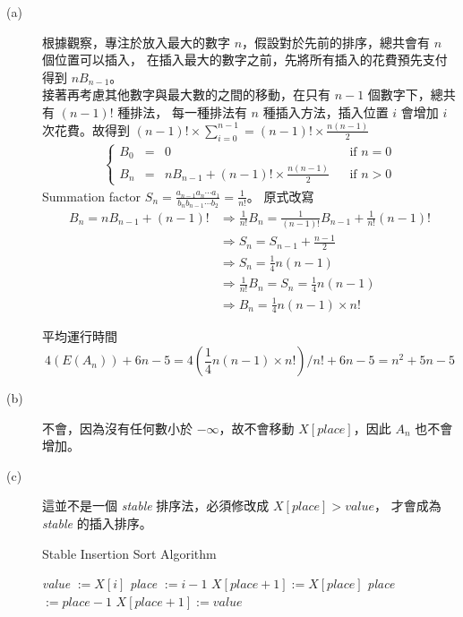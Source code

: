 \documentclass[11pt]{article}
\begin{document}
\begin{description}
	\item[(a)] 
		根據觀察，專注於放入最大的數字 $n$，假設對於先前的排序，總共會有 $n$ 個位置可以插入，
		在插入最大的數字之前，先將所有插入的花費預先支付得到 $n B_{n-1}$。 \\
		接著再考慮其他數字與最大數的之間的移動，在只有 $n-1$ 個數字下，總共有 $(n-1)!$ 種排法，
		每一種排法有 $n$ 種插入方法，插入位置 $i$ 會增加 $i$ 次花費。故得到 $(n-1)! \times \sum_{i=0}^{n-1} = (n-1)! \times \frac{n(n-1)}{2}$
		\begin{align*}
			\left\{\begin{matrix}
				B_0 &=& 0 && \text{if } n = 0\\
				B_n &=& n B_{n-1} + (n-1)! \times \frac{n(n-1)}{2} && \text{if } n > 0
			\end{matrix}\right.
		\end{align*}
		Summation factor $S_n = \frac{a_{n-1} a_n \cdots a_1}{b_n b_{n-1} \cdots b_2} = \frac{1}{n!}$。
		原式改寫
		\begin{align*}
			B_n = n B_{n-1} + (n-1)! 
			&\Rightarrow \frac{1}{n!}B_n = \frac{1}{(n-1)!} B_{n-1} + \frac{1}{n!}(n-1)! \\
			&\Rightarrow S_n = S_{n-1} + \frac{n-1}{2} \\
			&\Rightarrow S_n = \frac{1}{4} n(n-1) \\
			&\Rightarrow \frac{1}{n!}B_n = S_n = \frac{1}{4} n(n-1) \\
			&\Rightarrow B_n = \frac{1}{4} n(n-1) \times n!
		\end{align*}
		
		平均運行時間 $$4(E(A_n)) + 6n - 5 = 4(\frac{1}{4} n(n-1) \times n!)/n! + 6n - 5 = n^2 + 5n - 5$$
	\item[(b)]
		不會，因為沒有任何數小於 $-\infty$，故不會移動 $X[\textit{place}]$，因此 $A_n$ 也不會增加。
	\item[(c)]
		這並不是一個 \textit{stable} 排序法，必須修改成 $X[\textit{place}] > \textit{value}$，
		才會成為 \textit{stable} 的插入排序。
\begin{algorithm}
  \caption{Stable Insertion Sort Algorithm}\label{insert}
  \begin{algorithmic}[2]
  				
		\State \textit{value} $:= X[i]$		
		\State \textit{place} $:= i-1$		
				
			\State $X[\textit{place}+1] := X[\textit{place}]$	
			\State \textit{place} $:= \textit{place} - 1$	
		\EndWhile
		\State $X[\textit{place}+1] := \textit{value}$	
	\EndFor
  \end{algorithmic}
\end{algorithm}
\end{description}
\end{document}
